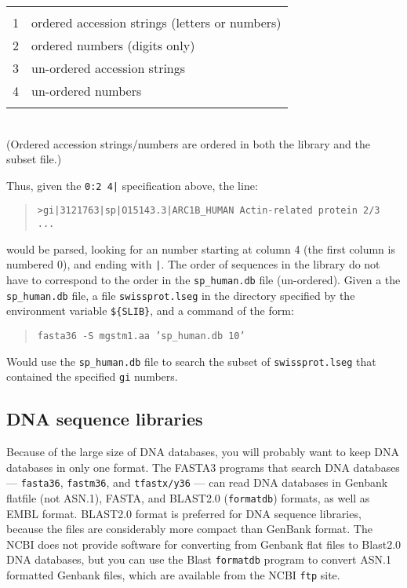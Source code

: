 \documentclass[11pt]{article}
\begin{document}
\begin{tabular}{l l}
\hline\\[-1.5ex]
1 & ordered accession strings  (letters or numbers)\\
2 & ordered numbers (digits only) \\
3 & un-ordered accession strings \\
4 & un-ordered numbers \\
\hline\\
\end{tabular}\\
(Ordered accession strings/numbers are ordered in both the library and the subset file.)

Thus, given the \texttt{0:2 4|} specification above, the line:
\begin{quote}
\texttt{>gi|3121763|sp|O15143.3|ARC1B\_HUMAN Actin-related protein 2/3 ...}
\end{quote}
would be parsed, looking for an number starting at column 4 (the first
column is numbered 0), and ending with \texttt{|}. The order of
sequences in the library do not have to correspond to the order in the
\texttt{sp\_human.db} file (un-ordered). Given a the
\texttt{sp\_human.db} file, a file \texttt{swissprot.lseg} in the
directory specified by the environment variable \texttt{\$\{SLIB\}},
and a command of the form:
\begin{quote}
\texttt{fasta36 -S mgstm1.aa 'sp\_human.db 10'}
\end{quote}
Would use the \texttt{sp\_human.db} file to search the subset of
\texttt{swissprot.lseg} that contained the specified \texttt{gi}
numbers.

\subsection{DNA sequence libraries}

Because of the large size of DNA databases, you will probably want to
keep DNA databases in only one format.  The FASTA3 programs that
search DNA databases --- \texttt{fasta36}, \texttt{fastm36}, and
\texttt{tfastx/y36} --- can read DNA databases in Genbank flatfile (not
ASN.1), FASTA, and BLAST2.0 (\texttt{formatdb}) formats, as well as
EMBL format.  BLAST2.0 format is preferred for DNA sequence libraries,
because the files are considerably more compact than GenBank format.
The NCBI does not provide software for converting from Genbank flat
files to Blast2.0 DNA databases, but you can use the Blast
\texttt{formatdb} program to convert ASN.1 formatted Genbank files,
which are available from the NCBI \texttt{ftp} site.
\end{document}
